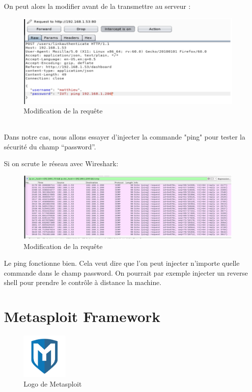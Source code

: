  On peut alors la modifier avant de la transmettre au serveur :
\begin{figure}[htp!]
  \centering
  \setlength\figureheight{7cm}
  \setlength\figurewidth{9cm}
  \includegraphics[width=1\textwidth]{oui/Ancien/imangeancien/burpsuite/burpsuite7.PNG}
  \caption{Modification de la requête}
  \label{fig:courbe-tikz}
\end{figure}\\
Dans notre cas, nous allons essayer d’injecter la commande "ping" pour tester la sécurité du champ “password”.\\

\newpage

 Si on scrute le réseau avec Wireshark:
\begin{figure}[htp!]
  \centering
  \setlength\figureheight{7cm}
  \setlength\figurewidth{9cm}
  \includegraphics[width=1\textwidth]{oui/Ancien/imangeancien/burpsuite/burpsuite8.PNG}
  \caption{Modification de la requête}
  \label{fig:courbe-tikz}
\end{figure}

Le ping fonctionne bien. Cela veut dire que l'on peut injecter n’importe quelle commande dans le champ password. On pourrait par exemple injecter un reverse shell pour prendre le contrôle à distance la machine.


\section{Metasploit Framework}
\begin{figure}[htp!]
  \centering
  \setlength\figureheight{7cm}
  \setlength\figurewidth{9cm}
  \includegraphics[width=0.2\textwidth]{oui/Ancien/imangeancien/metasploit.png}
  \caption{Logo de Metasploit}
  \label{fig:courbe-tikz}
\end{figure}


